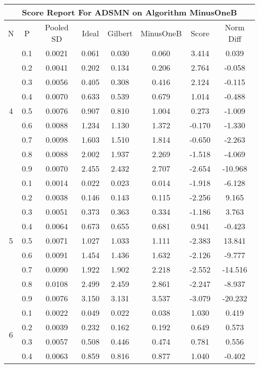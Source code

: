 \documentclass[11pt,a4paper]{report}
\begin{document}
\begin{longtable}{ | c | c || c | c | c | c | c | c | }
\hline
\multicolumn{8}{|c|}{ Score Report For ADSMN on Algorithm MinusOneB} \\
\hline
N & P & Pooled SD &  Ideal &  Gilbert & MinusOneB  & Score & Norm Diff \\
 \hline
 \hline
 \endhead
\multirow{9}{*}{4} & 0.1 & 0.0021 & 0.061 & 0.030 & 0.060 & 3.414 & 0.039 \\
 & 0.2 & 0.0041 & 0.202 & 0.134 & 0.206 & 2.764 & -0.058 \\
 & 0.3 & 0.0056 & 0.405 & 0.308 & 0.416 & 2.124 & -0.115 \\
 & 0.4 & 0.0070 & 0.633 & 0.539 & 0.679 & 1.014 & -0.488 \\
 & 0.5 & 0.0076 & 0.907 & 0.810 & 1.004 & 0.273 & -1.009 \\
 & 0.6 & 0.0088 & 1.234 & 1.130 & 1.372 & -0.170 & -1.330 \\
 & 0.7 & 0.0098 & 1.603 & 1.510 & 1.814 & -0.650 & -2.263 \\
 & 0.8 & 0.0088 & 2.002 & 1.937 & 2.269 & -1.518 & -4.069 \\
 & 0.9 & 0.0070 & 2.455 & 2.432 & 2.707 & -2.654 & -10.968 \\
 \hline
\multirow{9}{*}{5} & 0.1 & 0.0014 & 0.022 & 0.023 & 0.014 & -1.918 & -6.128 \\
 & 0.2 & 0.0038 & 0.146 & 0.143 & 0.115 & -2.256 & 9.165 \\
 & 0.3 & 0.0051 & 0.373 & 0.363 & 0.334 & -1.186 & 3.763 \\
 & 0.4 & 0.0064 & 0.673 & 0.655 & 0.681 & 0.941 & -0.423 \\
 & 0.5 & 0.0071 & 1.027 & 1.033 & 1.111 & -2.383 & 13.841 \\
 & 0.6 & 0.0091 & 1.454 & 1.436 & 1.632 & -2.126 & -9.777 \\
 & 0.7 & 0.0090 & 1.922 & 1.902 & 2.218 & -2.552 & -14.516 \\
 & 0.8 & 0.0108 & 2.499 & 2.459 & 2.861 & -2.247 & -8.937 \\
 & 0.9 & 0.0076 & 3.150 & 3.131 & 3.537 & -3.079 & -20.232 \\
 \hline
\multirow{9}{*}{6} & 0.1 & 0.0022 & 0.049 & 0.022 & 0.038 & 1.030 & 0.419 \\
 & 0.2 & 0.0039 & 0.232 & 0.162 & 0.192 & 0.649 & 0.573 \\
 & 0.3 & 0.0057 & 0.508 & 0.446 & 0.474 & 0.781 & 0.556 \\
 & 0.4 & 0.0063 & 0.859 & 0.816 & 0.877 & 1.040 & -0.402 \\

\end{longtable}
\end{document}
